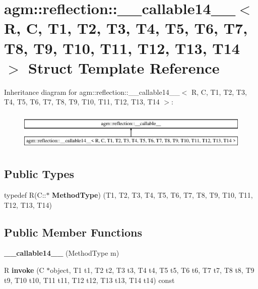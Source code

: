 \hypertarget{structagm_1_1reflection_1_1____callable14____}{}\section{agm\+:\+:reflection\+:\+:\+\_\+\+\_\+callable14\+\_\+\+\_\+$<$ R, C, T1, T2, T3, T4, T5, T6, T7, T8, T9, T10, T11, T12, T13, T14 $>$ Struct Template Reference}
\label{structagm_1_1reflection_1_1____callable14____}
Inheritance diagram for agm\+:\+:reflection\+:\+:\+\_\+\+\_\+callable14\+\_\+\+\_\+$<$ R, C, T1, T2, T3, T4, T5, T6, T7, T8, T9, T10, T11, T12, T13, T14 $>$\+:\begin{figure}[H]
\begin{center}
\leavevmode
\includegraphics[height=1.863561cm]{structagm_1_1reflection_1_1____callable14____}
\end{center}
\end{figure}
\subsection*{Public Types}
\begin{DoxyCompactItemize}
\item 
typedef R(C\+::$\ast$ {\bfseries Method\+Type}) (T1, T2, T3, T4, T5, T6, T7, T8, T9, T10, T11, T12, T13, T14)\hypertarget{structagm_1_1reflection_1_1____callable14_____a3b98b7cdb2675e453b0d5abf4aa887cd}{}\label{structagm_1_1reflection_1_1____callable14_____a3b98b7cdb2675e453b0d5abf4aa887cd}

\end{DoxyCompactItemize}
\subsection*{Public Member Functions}
\begin{DoxyCompactItemize}
\item 
{\bfseries \+\_\+\+\_\+callable14\+\_\+\+\_\+} (Method\+Type m)\hypertarget{structagm_1_1reflection_1_1____callable14_____a884c61b5e7a9843d1ce83d9543bde8fa}{}\label{structagm_1_1reflection_1_1____callable14_____a884c61b5e7a9843d1ce83d9543bde8fa}

\item 
R {\bfseries invoke} (C $\ast$object, T1 t1, T2 t2, T3 t3, T4 t4, T5 t5, T6 t6, T7 t7, T8 t8, T9 t9, T10 t10, T11 t11, T12 t12, T13 t13, T14 t14) const \hypertarget{structagm_1_1reflection_1_1____callable14_____ac69d21f8b82a44575069ecbe1a505703}{}\label{structagm_1_1reflection_1_1____callable14_____ac69d21f8b82a44575069ecbe1a505703}

\end{DoxyCompactItemize}
